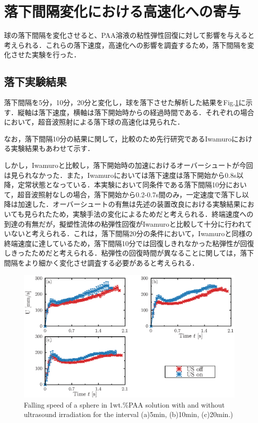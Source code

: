 \section{落下間隔変化における高速化への寄与}
球の落下間隔を変化させると、PAA溶液の粘性弾性回復に対して影響を与えると考えられる．これらの落下速度，高速化への影響を調査するため，落下間隔を変化させた実験を行った．

\subsection{落下実験結果}

落下間隔を5分，10分，20分と変化し，球を落下させた解析した結果をFig.\ref{fig:falling-interval}に示す．縦軸は落下速度，横軸は落下開始時からの経過時間である．それぞれの場合において，超音波照射による落下球の高速化は見られた．

なお，落下間隔10分の結果に関して，比較のため先行研究であるIwamuro\cite{ref:9}における実験結果もあわせて示す．

しかし，Iwamuro\cite{ref:9}と比較し，落下開始時の加速におけるオーバーシュートが今回は見られなかった．また，Iwamuro\cite{ref:9}においては落下速度は落下開始から0.8s以降，定常状態となっている．本実験において同条件である落下間隔10分において，超音波照射なしの場合，落下開始から0.2-0.7s間のみ，一定速度で落下し以降は加速した．オーバーシュートの有無は先述の装置改良における実験結果においても見られたため，実験手法の変化によるためだと考えられる．終端速度への到達の有無だが，擬塑性流体の粘弾性回復がIwamuro\cite{ref:9}と比較して十分に行われていないと考えられる．これは，落下間隔20分の条件において，Iwamuro\cite{ref:9}と同様の終端速度に達しているため，落下間隔10分では回復しきれなかった粘弾性が回復しきったためだと考えられる．粘弾性の回復時間が異なることに関しては，落下間隔をより細かく変化させ調査する必要があると考えられる．

\begin{figure}[ht]
    \centering
    \includegraphics[width=1\textwidth]{./X-Appendix/interval/interval.eps}
    \caption{Falling speed of a sphere in 1wt.\%PAA solution with and without ultrasound irradiation for the interval (a)5min, (b)10min, (c)20min.)}
    \label{fig:falling-interval}
\end{figure}

